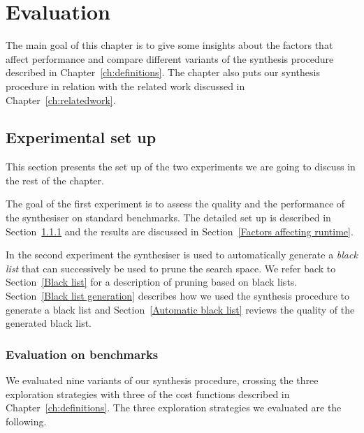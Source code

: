 \lstset{style=plain}

\chapter{Evaluation} \label{evaluation}

The main goal of this chapter is to give some insights about the factors that affect performance and compare different variants of the synthesis procedure described in Chapter~\ref{ch:definitions}. The chapter also puts our synthesis procedure in relation with the related work discussed in Chapter~\ref{ch:relatedwork}.


\section{Experimental set up}
This section presents the set up of the two experiments we are going to discuss in the rest of the chapter.

The goal of the first experiment is to assess the quality and the performance of the synthesiser on standard benchmarks. The detailed set up is described in Section~\ref{Evaluation on benchmarks} and the results are discussed in Section~\ref{Factors affecting runtime}.

In the second experiment the synthesiser is used to automatically generate a \emph{black list} that can successively be used to prune the search space. We refer back to Section~\ref{Black list} for a description of pruning based on black lists. Section~\ref{Black list generation} describes how we used the synthesis procedure to generate a black list and Section~\ref{Automatic black list} reviews the quality of the generated black list.

\subsection{Evaluation on benchmarks}\label{Evaluation on benchmarks}

We evaluated nine variants of our synthesis procedure, crossing the three exploration strategies with three of the cost functions described in Chapter~\ref{ch:definitions}. The three exploration strategies we evaluated are the following.


